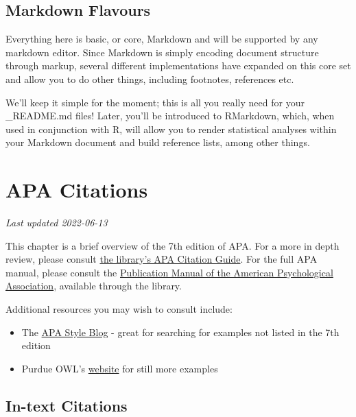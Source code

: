 \documentclass[
]{book}
\providecommand{\tightlist}{%
  \setlength{\itemsep}{0pt}\setlength{\parskip}{0pt}}
\begin{document}
\hypertarget{markdown-flavours}{%
\section{Markdown Flavours}\label{markdown-flavours}}

Everything here is basic, or core, Markdown and will be supported by any markdown editor. Since Markdown is simply encoding document structure through markup, several different implementations have expanded on this core set and allow you to do other things, including footnotes, references etc.

We'll keep it simple for the moment; this is all you really need for your \_README.md files! Later, you'll be introduced to RMarkdown, which, when used in conjunction with R, will allow you to render statistical analyses within your Markdown document and build reference lists, among other things.

\hypertarget{apa-citations}{%
\chapter{APA Citations}\label{apa-citations}}

\emph{Last updated 2022-06-13}

This chapter is a brief overview of the 7th edition of APA. For a more in depth review, please consult \href{https://guides.library.ubc.ca/apacitationstyle}{the library's APA Citation Guide}. For the full APA manual, please consult the \href{http://resolve.library.ubc.ca/cgi-bin/catsearch?bid=10057275}{Publication Manual of the American Psychological Association}, available through the library.

Additional resources you may wish to consult include:

\begin{itemize}
\tightlist
\item
  The \href{https://apastyle.apa.org/blog/}{APA Style Blog} - great for searching for examples not listed in the 7th edition
\item
  Purdue OWL's \href{https://owl.purdue.edu/owl/research_and_citation/apa_style/apa_formatting_and_style_guide/general_format.html}{website} for still more examples
\end{itemize}

\hypertarget{in-text-citations}{%
\section{In-text Citations}\label{in-text-citations}}
\end{document}
